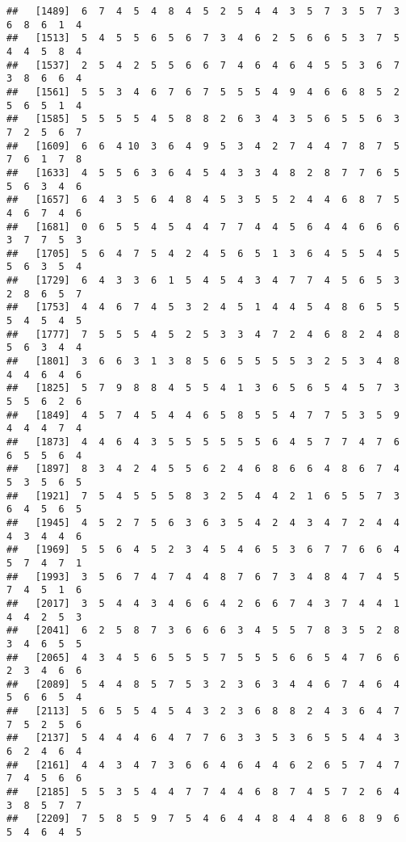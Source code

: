 \documentclass[
]{book}
\begin{document}
\begin{verbatim}
##   [1489]  6  7  4  5  4  8  4  5  2  5  4  4  3  5  7  3  5  7  3  6  8  6  1  4
##   [1513]  5  4  5  5  6  5  6  7  3  4  6  2  5  6  6  5  3  7  5  4  4  5  8  4
##   [1537]  2  5  4  2  5  5  6  6  7  4  6  4  6  4  5  5  3  6  7  3  8  6  6  4
##   [1561]  5  5  3  4  6  7  6  7  5  5  5  4  9  4  6  6  8  5  2  5  6  5  1  4
##   [1585]  5  5  5  5  4  5  8  8  2  6  3  4  3  5  6  5  5  6  3  7  2  5  6  7
##   [1609]  6  6  4 10  3  6  4  9  5  3  4  2  7  4  4  7  8  7  5  7  6  1  7  8
##   [1633]  4  5  5  6  3  6  4  5  4  3  3  4  8  2  8  7  7  6  5  5  6  3  4  6
##   [1657]  6  4  3  5  6  4  8  4  5  3  5  5  2  4  4  6  8  7  5  4  6  7  4  6
##   [1681]  0  6  5  5  4  5  4  4  7  7  4  4  5  6  4  4  6  6  6  3  7  7  5  3
##   [1705]  5  6  4  7  5  4  2  4  5  6  5  1  3  6  4  5  5  4  5  5  6  3  5  4
##   [1729]  6  4  3  3  6  1  5  4  5  4  3  4  7  7  4  5  6  5  3  2  8  6  5  7
##   [1753]  4  4  6  7  4  5  3  2  4  5  1  4  4  5  4  8  6  5  5  5  4  5  4  5
##   [1777]  7  5  5  5  4  5  2  5  3  3  4  7  2  4  6  8  2  4  8  5  6  3  4  4
##   [1801]  3  6  6  3  1  3  8  5  6  5  5  5  5  3  2  5  3  4  8  4  4  6  4  6
##   [1825]  5  7  9  8  8  4  5  5  4  1  3  6  5  6  5  4  5  7  3  5  5  6  2  6
##   [1849]  4  5  7  4  5  4  4  6  5  8  5  5  4  7  7  5  3  5  9  4  4  4  7  4
##   [1873]  4  4  6  4  3  5  5  5  5  5  5  6  4  5  7  7  4  7  6  6  5  5  6  4
##   [1897]  8  3  4  2  4  5  5  6  2  4  6  8  6  6  4  8  6  7  4  5  3  5  6  5
##   [1921]  7  5  4  5  5  5  8  3  2  5  4  4  2  1  6  5  5  7  3  6  4  5  6  5
##   [1945]  4  5  2  7  5  6  3  6  3  5  4  2  4  3  4  7  2  4  4  4  3  4  4  6
##   [1969]  5  5  6  4  5  2  3  4  5  4  6  5  3  6  7  7  6  6  4  5  7  4  7  1
##   [1993]  3  5  6  7  4  7  4  4  8  7  6  7  3  4  8  4  7  4  5  7  4  5  1  6
##   [2017]  3  5  4  4  3  4  6  6  4  2  6  6  7  4  3  7  4  4  1  4  4  2  5  3
##   [2041]  6  2  5  8  7  3  6  6  6  3  4  5  5  7  8  3  5  2  8  3  4  6  5  5
##   [2065]  4  3  4  5  6  5  5  5  7  5  5  5  6  6  5  4  7  6  6  2  3  4  6  6
##   [2089]  5  4  4  8  5  7  5  3  2  3  6  3  4  4  6  7  4  6  4  5  6  6  5  4
##   [2113]  5  6  5  5  4  5  4  3  2  3  6  8  8  2  4  3  6  4  7  7  5  2  5  6
##   [2137]  5  4  4  4  6  4  7  7  6  3  3  5  3  6  5  5  4  4  3  6  2  4  6  4
##   [2161]  4  4  3  4  7  3  6  6  4  6  4  4  6  2  6  5  7  4  7  7  4  5  6  6
##   [2185]  5  5  3  5  4  4  7  7  4  4  6  8  7  4  5  7  2  6  4  3  8  5  7  7
##   [2209]  7  5  8  5  9  7  5  4  6  4  4  8  4  4  8  6  8  9  6  5  4  6  4  5

\end{verbatim}
\end{document}
